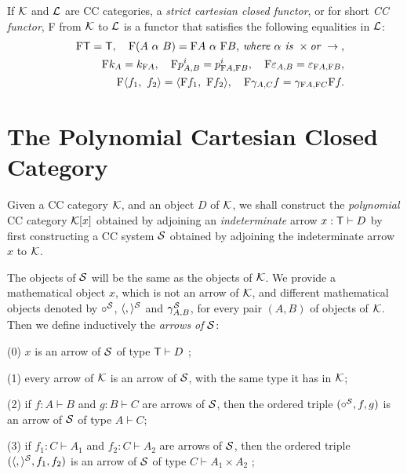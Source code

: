 \documentclass[12pt]{article}
\begin{document}
If ${\cal K}$ and ${\cal L}$ are CC categories, a {\it strict cartesian
closed functor}, or for short {\it CC functor}, F from ${\cal K}$ to ${\cal L%
}$ is a functor that satisfies the following equalities in ${\cal L}$: 
\begin{eqnarray*}
&&\text{F{\sf T}}=\text{{\sf T}},\quad \text{F}(A~\alpha ~B)=\text{F}%
A~\alpha ~\text{F}B\text{,{\it \ where }}\alpha \text{{\it \ is }}\times 
\text{{\it or} }\rightarrow \text{,} \\
&&\text{F}k_{A}=k_{\text{F}A},\quad \text{F}p_{A,B}^{i}=p_{\text{F}A,\text{F}%
B}^{i},\quad \text{F}\varepsilon _{A,B}=\varepsilon _{\text{F}A,\text{F}B},
\\
&&\text{F}\langle f_{1},~f_{2}\rangle =\langle \text{F}f_{1},~\text{F}%
f_{2}\rangle ,\quad \text{F}\gamma _{A,C}f=\gamma _{\text{F}A,\text{F}C}%
\text{F}f.
\end{eqnarray*}

\section{The Polynomial Cartesian Closed Category}

\noindent Given a CC category ${\cal K}$, and an object $D$ of ${\cal K}$,
we shall construct the {\it polynomial} CC category ${\cal K}[x]$ obtained
by adjoining an {\it indeterminate} arrow $x:{\sf T}\vdash D$ by first
constructing a CC system ${\cal S}$ obtained by adjoining the indeterminate
arrow $x$ to ${\cal K}$.

The objects of ${\cal S}$ will be the same as the objects of ${\cal K}$. We
provide a mathematical object $x$, which is not an arrow of ${\cal K}$, and
different mathematical objects denoted by $\circ ^{{\cal S}}$, $\langle
,\rangle ^{{\cal S}}$ and $\gamma _{A,B}^{{\cal S}}$, for every pair $(A,B)$
of objects of ${\cal K}$. Then we define inductively the {\it arrows of} $%
{\cal S}$:\medskip

\noindent (0) $x$ is an arrow of ${\cal S}$ of type ${\sf T}\vdash D$%
;\smallskip

\noindent (1) every arrow of ${\cal K}$ is an arrow of ${\cal S}$, with the
same type it has in ${\cal K}$;\smallskip

\noindent (2) if $f:A\vdash B$ and $g:B\vdash C$ are arrows of ${\cal S}$,
then the ordered triple $(\circ ^{{\cal S}},f,g)$ is an arrow of ${\cal S}$
of type $A\vdash C$;\smallskip

\noindent (3) if $f_{1}:C\vdash A_{1}$ and $f_{2}:C\vdash A_{2}$ are arrows
of ${\cal S}$, then the ordered triple $(\langle ,\rangle ^{{\cal S}%
},f_{1},f_{2})$ is an arrow of ${\cal S}$ of type $C\vdash A_{1}\times A_{2}$%
;\smallskip
\end{document}

